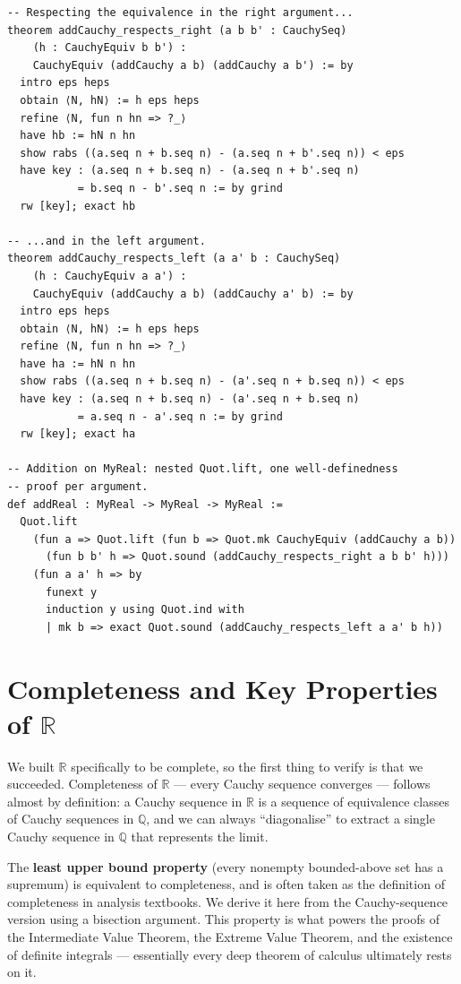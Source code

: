 \documentclass[12pt, openany]{book}
\theoremstyle{plain}
\theoremstyle{definition}
\theoremstyle{remark}
\newcommand{\Q}{\mathbb{Q}}
\newcommand{\R}{\mathbb{R}}
\begin{document}
\begin{leanbox}
\begin{lstlisting}
-- Respecting the equivalence in the right argument...
theorem addCauchy_respects_right (a b b' : CauchySeq)
    (h : CauchyEquiv b b') :
    CauchyEquiv (addCauchy a b) (addCauchy a b') := by
  intro eps heps
  obtain ⟨N, hN⟩ := h eps heps
  refine ⟨N, fun n hn => ?_⟩
  have hb := hN n hn
  show rabs ((a.seq n + b.seq n) - (a.seq n + b'.seq n)) < eps
  have key : (a.seq n + b.seq n) - (a.seq n + b'.seq n)
           = b.seq n - b'.seq n := by grind
  rw [key]; exact hb

-- ...and in the left argument.
theorem addCauchy_respects_left (a a' b : CauchySeq)
    (h : CauchyEquiv a a') :
    CauchyEquiv (addCauchy a b) (addCauchy a' b) := by
  intro eps heps
  obtain ⟨N, hN⟩ := h eps heps
  refine ⟨N, fun n hn => ?_⟩
  have ha := hN n hn
  show rabs ((a.seq n + b.seq n) - (a'.seq n + b.seq n)) < eps
  have key : (a.seq n + b.seq n) - (a'.seq n + b.seq n)
           = a.seq n - a'.seq n := by grind
  rw [key]; exact ha

-- Addition on MyReal: nested Quot.lift, one well-definedness
-- proof per argument.
def addReal : MyReal -> MyReal -> MyReal :=
  Quot.lift
    (fun a => Quot.lift (fun b => Quot.mk CauchyEquiv (addCauchy a b))
      (fun b b' h => Quot.sound (addCauchy_respects_right a b b' h)))
    (fun a a' h => by
      funext y
      induction y using Quot.ind with
      | mk b => exact Quot.sound (addCauchy_respects_left a a' b h))
\end{lstlisting}
\end{leanbox}
\color{black}

\section{Completeness and Key Properties of \texorpdfstring{$\R$}{R}}

We built $\R$ specifically to be complete, so the first thing to verify is that we succeeded.  Completeness of $\R$ --- every Cauchy sequence converges --- follows almost by definition: a Cauchy sequence in $\R$ is a sequence of equivalence classes of Cauchy sequences in $\Q$, and we can always ``diagonalise'' to extract a single Cauchy sequence in $\Q$ that represents the limit.

The \textbf{least upper bound property} (every nonempty bounded-above set has a supremum) is equivalent to completeness, and is often taken as the definition of completeness in analysis textbooks.  We derive it here from the Cauchy-sequence version using a bisection argument.  This property is what powers the proofs of the Intermediate Value Theorem, the Extreme Value Theorem, and the existence of definite integrals --- essentially every deep theorem of calculus ultimately rests on it.
\end{document}
